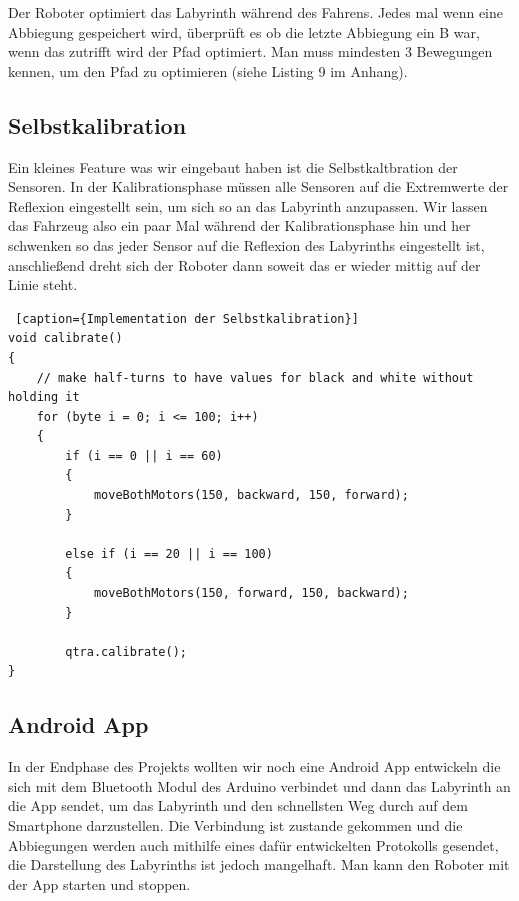 \documentclass[12pt]{article}
\begin{document}
Der Roboter optimiert das Labyrinth während des Fahrens. Jedes mal wenn eine Abbiegung gespeichert wird, überprüft es ob die letzte Abbiegung ein B war, wenn das zutrifft wird der Pfad optimiert. Man muss mindesten 3 Bewegungen kennen, um den Pfad zu optimieren (siehe Listing 9 im Anhang). 

\subsection{Selbstkalibration}
Ein kleines Feature was wir eingebaut haben ist die Selbstkaltbration der Sensoren. In der Kalibrationsphase müssen alle Sensoren auf die Extremwerte der Reflexion eingestellt sein, um sich so an das Labyrinth anzupassen. Wir lassen das Fahrzeug also ein paar Mal während der Kalibrationsphase hin und her schwenken so das jeder Sensor auf die Reflexion des Labyrinths eingestellt ist, anschließend dreht sich der Roboter dann soweit das er wieder mittig auf der Linie steht.
\begin{lstlisting} [caption={Implementation der Selbstkalibration}]
void calibrate()
{
    // make half-turns to have values for black and white without holding it
    for (byte i = 0; i <= 100; i++)
    {
        if (i == 0 || i == 60)
        {
            moveBothMotors(150, backward, 150, forward);
        }

        else if (i == 20 || i == 100)
        {
            moveBothMotors(150, forward, 150, backward);
        }

        qtra.calibrate();
}
\end{lstlisting}

\subsection{Android App} In der Endphase des Projekts wollten wir noch eine Android App entwickeln die sich mit dem Bluetooth Modul des Arduino verbindet und dann das Labyrinth an die App sendet, um das Labyrinth  und den schnellsten Weg durch auf dem Smartphone darzustellen. Die Verbindung ist zustande gekommen und die Abbiegungen werden auch mithilfe eines dafür entwickelten Protokolls gesendet, die Darstellung des Labyrinths ist jedoch mangelhaft. Man kann den Roboter mit der App starten und stoppen.
\end{document}
